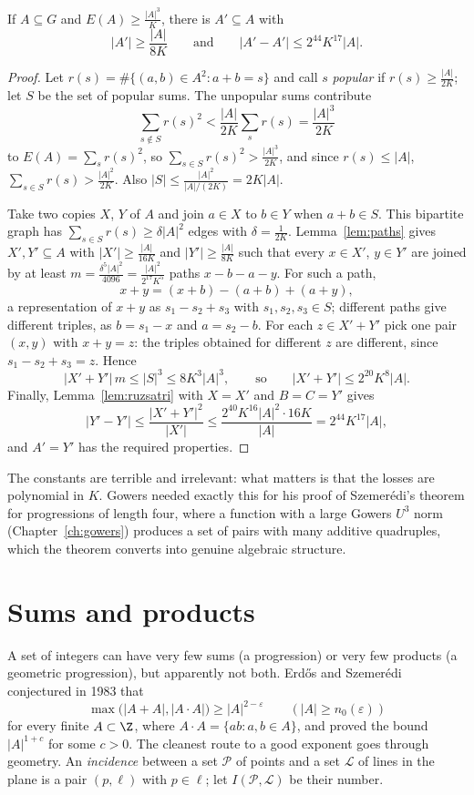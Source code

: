 \begin{theorem}\label{thm:bsg}
If $A\subseteq G$ and $E(A)\ge\frac{|A|^3}K$, there is $A'\subseteq A$ with
\[
|A'|\ge\frac{|A|}{8K}\qquad\text{and}\qquad|A'-A'|\le2^{44}K^{17}|A|.
\]
\end{theorem}
\begin{proof}
Let $r(s)=\#\{(a,b)\in A^2:a+b=s\}$ and call $s$ \emph{popular} if $r(s)\ge\frac{|A|}{2K}$; let $S$ be the set of popular sums. The unpopular sums contribute
\[
\sum_{s\notin S}r(s)^2<\frac{|A|}{2K}\sum_sr(s)=\frac{|A|^3}{2K}
\]
to $E(A)=\sum_sr(s)^2$, so $\sum_{s\in S}r(s)^2>\frac{|A|^3}{2K}$, and since $r(s)\le|A|$, $\sum_{s\in S}r(s)>\frac{|A|^2}{2K}$. Also $|S|\le\frac{|A|^2}{|A|/(2K)}=2K|A|$.

Take two copies $X$, $Y$ of $A$ and join $a\in X$ to $b\in Y$ when $a+b\in S$. This bipartite graph has $\sum_{s\in S}r(s)\ge\delta|A|^2$ edges with $\delta=\frac1{2K}$. Lemma~\ref{lem:paths} gives $X',Y'\subseteq A$ with $|X'|\ge\frac{|A|}{16K}$ and $|Y'|\ge\frac{|A|}{8K}$ such that every $x\in X'$, $y\in Y'$ are joined by at least $m=\frac{\delta^5|A|^2}{4096}=\frac{|A|^2}{2^{17}K^5}$ paths $x-b-a-y$. For such a path,
\[
x+y=(x+b)-(a+b)+(a+y),
\]
a representation of $x+y$ as $s_1-s_2+s_3$ with $s_1,s_2,s_3\in S$; different paths give different triples, as $b=s_1-x$ and $a=s_2-b$. For each $z\in X'+Y'$ pick one pair $(x,y)$ with $x+y=z$: the triples obtained for different $z$ are different, since $s_1-s_2+s_3=z$. Hence
\[
|X'+Y'|\,m\le|S|^3\le8K^3|A|^3,\qquad\text{so}\qquad|X'+Y'|\le2^{20}K^8|A|.
\]
Finally, Lemma~\ref{lem:ruzsatri} with $X=X'$ and $B=C=Y'$ gives
\[
|Y'-Y'|\le\frac{|X'+Y'|^2}{|X'|}\le\frac{2^{40}K^{16}|A|^2\cdot16K}{|A|}=2^{44}K^{17}|A|,
\]
and $A'=Y'$ has the required properties.
\end{proof}

The constants are terrible and irrelevant: what matters is that the losses are polynomial in $K$. Gowers needed exactly this for his proof of Szemerédi's theorem for progressions of length four, where a function with a large Gowers $U^3$ norm (Chapter~\ref{ch:gowers}) produces a set of pairs with many additive quadruples, which the theorem converts into genuine algebraic structure.

\section{Sums and products}

A set of integers can have very few sums (a progression) or very few products (a geometric progression), but apparently not both. Erdős and Szemerédi conjectured in 1983 that
\[
\max\bigl(|A+A|,|A\cdot A|\bigr)\ge|A|^{2-\varepsilon}\qquad(|A|\ge n_0(\varepsilon))
\]
for every finite $A\subset\Z$, where $A\cdot A=\{ab:a,b\in A\}$, and proved the bound $|A|^{1+c}$ for some $c>0$. The cleanest route to a good exponent goes through geometry. An \emph{incidence} between a set $\mathcal P$ of points and a set $\mathcal L$ of lines in the plane is a pair $(p,\ell)$ with $p\in\ell$; let $I(\mathcal P,\mathcal L)$ be their number.

